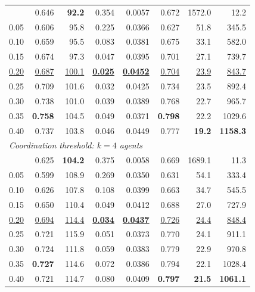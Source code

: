 \documentclass[pdflatex,sn-mathphys-num]{sn-jnl}%
\theoremstyle{thmstyleone}%
\theoremstyle{thmstyletwo}%
\theoremstyle{thmstylethree}%
\begin{document}
\begin{appendices}
\begin{table}[htbp]
\begin{tabular}{lrrrrrrr}
\addlinespace[2pt]
0.00 & 0.646 & \textbf{92.2} & 0.354 & 0.0057 & 0.672 & 1572.0 & 12.2 \\
0.05 & 0.606 & 95.8 & 0.225 & 0.0366 & 0.627 & 51.8 & 345.5 \\
0.10 & 0.659 & 95.5 & 0.083 & 0.0381 & 0.675 & 33.1 & 582.0 \\
0.15 & 0.674 & 97.3 & 0.047 & 0.0395 & 0.701 & 27.1 & 739.7 \\
\underline{0.20} & \underline{0.687} & \underline{100.1} & \underline{\textbf{0.025}} & \underline{\textbf{0.0452}} & \underline{0.704} & \underline{23.9} & \underline{843.7} \\
0.25 & 0.709 & 101.6 & 0.032 & 0.0425 & 0.734 & 23.5 & 892.4 \\
0.30 & 0.738 & 101.0 & 0.039 & 0.0389 & 0.768 & 22.7 & 965.7 \\
0.35 & \textbf{0.758} & 104.5 & 0.049 & 0.0371 & \textbf{0.798} & 22.2 & 1029.6 \\
0.40 & 0.737 & 103.8 & 0.046 & 0.0449 & 0.777 & \textbf{19.2} & \textbf{1158.3} \\
\midrule
\multicolumn{8}{l}{\textit{Coordination threshold: $k=4$ agents}} \\
\addlinespace[2pt]
0.00 & 0.625 & \textbf{104.2} & 0.375 & 0.0058 & 0.669 & 1689.1 & 11.3 \\
0.05 & 0.599 & 108.9 & 0.269 & 0.0350 & 0.631 & 54.1 & 333.4 \\
0.10 & 0.626 & 107.8 & 0.108 & 0.0399 & 0.663 & 34.7 & 545.5 \\
0.15 & 0.650 & 110.4 & 0.049 & 0.0412 & 0.688 & 27.0 & 727.9 \\
\underline{0.20} & \underline{0.694} & \underline{114.4} & \underline{\textbf{0.034}} & \underline{\textbf{0.0437}} & \underline{0.726} & \underline{24.4} & \underline{848.4} \\
0.25 & 0.721 & 115.9 & 0.051 & 0.0373 & 0.770 & 24.1 & 911.1 \\
0.30 & 0.724 & 111.8 & 0.059 & 0.0383 & 0.779 & 22.9 & 970.8 \\
0.35 & \textbf{0.727} & 114.6 & 0.072 & 0.0386 & 0.794 & 22.1 & 1028.4 \\
0.40 & 0.721 & 114.7 & 0.080 & 0.0409 & \textbf{0.797} & \textbf{21.5} & \textbf{1061.1} \\
\bottomrule
\end{tabular}
\end{table}

\end{appendices}
\end{document}
